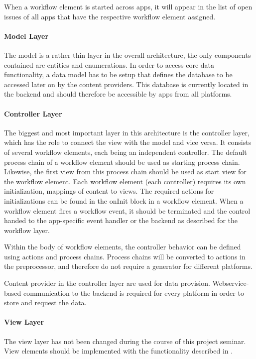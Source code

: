 When a workflow element is started across apps, it will appear in the list of open issues of all apps that have the respective workflow element assigned.

\paragraph*{Model Layer}
The model is a rather thin layer in the overall architecture, the only components contained are entities and enumerations. In order to access core data functionality, a data model has to be setup that defines the database to be accessed later on by the content providers. This database is currently located in the backend and should therefore be accessible by apps from all platforms. 

\paragraph*{Controller Layer}
The biggest and most important layer in this architecture is the controller layer, which has the role to connect the view with the model and vice versa. It consists of several workflow elements, each being an independent controller. The default process chain of a workflow element should be used as starting process chain. Likewise, the first view from this process chain should be used as start view for the workflow element. Each workflow element (\ie each controller) requires its own initialization, \eg mappings of content to views. The required actions for initializations can be found in the onInit block in a workflow element. When a workflow element fires a workflow event, it should be terminated and the control handed to the app-specific event handler or the backend as described for the workflow layer. 

Within the body of workflow elements, the controller behavior can be defined using actions and process chains. Process chains will be converted to actions in the preprocessor, and therefore do not require a generator for different platforms.

Content provider in the controller layer are used for data provision. Webservice-based communication to the backend is required for every platform in order to store and request the data.

\paragraph*{View Layer}

The view layer has not been changed during the course of this project seminar. View elements should be implemented with the functionality described in .
 